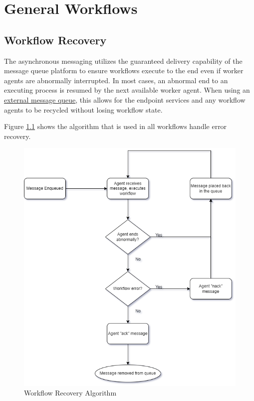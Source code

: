 \chapter{General Workflows}\label{sec:general-workflows}


\section{Workflow Recovery}\label{sec:recovery-workflow}

The asynchronous messaging utilizes the guaranteed delivery capability of the message queue platform
to ensure workflows execute to the end even if worker agents are abnormally interrupted.  In most cases,
an abnormal end to an executing process is resumed by the next available worker agent.  
When using an \hyperref[sec:external-mq]{external message queue}, this allows for the \cxoneflow endpoint services and
any workflow agents to be recycled without losing workflow state.

Figure \ref{fig:recovery-flowchart} shows the algorithm that is used
in all workflows handle error recovery.  


\begin{figure}[ht]
    \includegraphics[width=\textwidth]{graphics/cxoneflow-diagrams-Recovery Algorithm.png}
    \caption{Workflow Recovery Algorithm}
    \label{fig:recovery-flowchart}
\end{figure}

